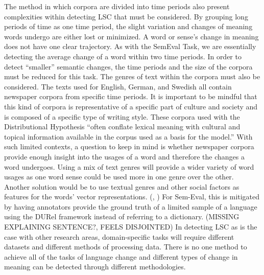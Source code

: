 The method in which corpora are divided into time periods also present complexities within detecting LSC that must be considered. \citep{hengchen2021challenges} By grouping long periods of time as one time period, the slight variation and changes of meaning words undergo are either lost or minimized. A word or sense’s change in meaning does not have one clear trajectory. As with the SemEval Task, we are essentially detecting the average change of a word within two time periods. In order to detect “smaller” semantic changes, the time periods and the size of the corpora must be reduced for this task. The genres of text within the corpora must also be considered. The texts used for English, German, and Swedish all contain newspaper corpora from specific time periods. It is important to be mindful that this kind of corpora is representative of a specific part of culture and society and is composed of a specific type of writing style. These corpora used with the Distributional Hypothesis “often conflate lexical meaning with cultural and topical information available in the corpus used as a basis for the model.” \citep{hengchen2021challenges} With such limited contexts, a question to keep in mind is whether newspaper corpora provide enough insight into the usages of a word and therefore the changes a word undergoes. \citep{hengchen2021challenges} Using a mix of text genres will provide a wider variety of word usages as one word sense could be used more in one genre over the other. Another solution would be to use textual genres and other social factors as features for the words' vector representations. (\citet{perrone-etal-2019-gasc}, \citet{jawahar-seddah-2019-contextualized}) For Sem-Eval, this is mitigated by having annotators provide the ground truth of a limited sample of a language using the DURel framework \citep{DURel2018} instead of referring to a dictionary. (MISSING EXPLAINING SENTENCE?, FEELS DISJOINTED) In detecting LSC as is the case with other research areas, domain-specific tasks will require different datasets and different methods of processing data. There is no one method to achieve all of the tasks of language change and different types of change in meaning can be detected through different methodologies. 
